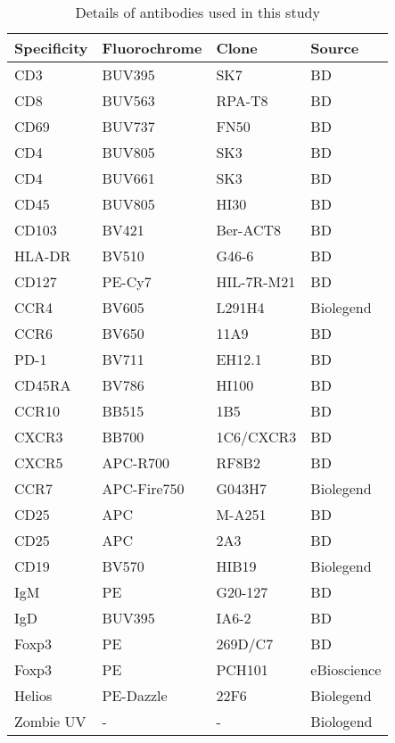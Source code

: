 \begin{table}
\footnotesize
\begin{center}
    \begin{tabular}{llll}
        \toprule
        Specificity & Fluorochrome & Clone & Source \\
        \midrule
        CD3 &  BUV395 & SK7 & BD \\
        CD8 & BUV563 & RPA-T8 & BD \\
        CD69 & BUV737 & FN50 & BD \\
        CD4 & BUV805 & SK3 & BD \\
        CD4 & BUV661 & SK3 & BD \\
        CD45 & BUV805 & HI30 & BD \\
        CD103 & BV421 & Ber-ACT8 & BD \\
        HLA-DR & BV510 & G46-6 & BD \\
        CD127 & PE-Cy7 & HIL-7R-M21 & BD \\
        CCR4 & BV605 & L291H4 & Biolegend \\
        CCR6 & BV650 & 11A9 & BD \\
        PD-1 & BV711 & EH12.1 & BD \\
        CD45RA & BV786 & HI100 & BD \\
        CCR10 & BB515 & 1B5 & BD \\
        CXCR3 & BB700 & 1C6/CXCR3 & BD \\
        CXCR5 & APC-R700 & RF8B2 & BD \\
        CCR7 & APC-Fire750 & G043H7 & Biolegend \\
        CD25 & APC & M-A251 & BD \\
        CD25 & APC & 2A3 & BD \\
        CD19 & BV570 & HIB19 & Biolegend \\
        IgM & PE & G20-127 & BD \\
        IgD & BUV395 & IA6-2 & BD \\
        Foxp3 & PE & 269D/C7 & BD \\
        Foxp3 & PE & PCH101 & eBioscience \\
        Helios & PE-Dazzle & 22F6 & Biolegend \\
        Zombie UV & - & - & Biologend \\
        \bottomrule
    \end{tabular}
\caption{Details of antibodies used in this study}
\label{table:panel}
\end{center}
\end{table}

